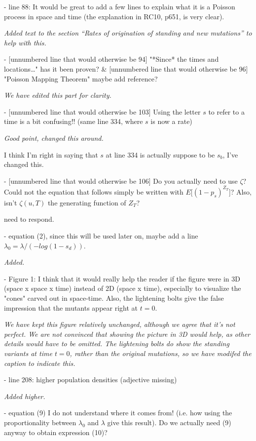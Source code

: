 \documentclass[12pt,letterpaper]{article}
\newcommand{\gc}[1]{{ \color{red} #1}}
\newcommand{\response}[1]{\emph{ \color{blue} #1}}
\begin{document}
- line 88: It would be great to add a few lines to explain what it is a Poisson process in space and time (the explanation in RC10, p651, is very clear).

\response{Added text to the section ``Rates of origination of standing and new mutations'' to help with this.} 

- [unnumbered line that would otherwise be 94] "*Since* the times and locations…" has it been proven? \& [unnumbered line that would otherwise be 96] "Poisson Mapping Theorem" maybe add reference?

\response{We have edited this part for clarity.}


- [unnumbered line that would otherwise be 103] Using the letter $s$ to refer to a time is a bit confusing!!
(same line 334, where $s$ is now a rate)

\response{Good point, changed this around.}

\gc{I think I'm right in saying that $s$ at line 334 is actually suppose to be $s_b$, I've changed this.}

- [unnumbered line that would otherwise be 106] Do you actually need to use $\zeta$? Could not the equation that follows simply be written with $E[(1-p_s)^{Z_T}$]? Also, isn't $\zeta(u,T)$ the generating function of $Z_T$?

\gc{need to respond.}

- equation (2), since this will be used later on, maybe add a line $\lambda_0 = \lambda / (-log(1-s_d))$.

\response{Added.}

- Figure 1: I think that it would really help the reader if the figure were in 3D (space x space x time) instead of 2D (space x time), especially to visualize the "cones" carved out in space-time. Also, the lightening bolts give the false impression that the mutants appear right at $t=0$.

\response{We have kept this figure relatively unchanged, although we agree that it's not perfect. We are not convinced that showing the picture in 3D would help, as other details would have to be omitted. The lightening bolts do show the standing variants at time $t=0$, rather than the original mutations, so we have modifed the caption to indicate this.}

- line 208: higher population densities (adjective missing)

\response{Added higher.}

- equation (9) I do not understand where it comes from! (i.e. how using the proportionality between $\lambda_0$ and $\lambda$ give this result). Do we actually need (9) anyway to obtain expression (10)?
\end{document}
